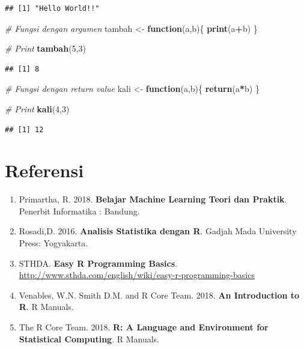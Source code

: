 \documentclass[]{book}
\newenvironment{Shaded}{\begin{snugshade}}{\end{snugshade}}
\newcommand{\KeywordTok}[1]{\textcolor[rgb]{0.13,0.29,0.53}{\textbf{#1}}}
\newcommand{\DecValTok}[1]{\textcolor[rgb]{0.00,0.00,0.81}{#1}}
\newcommand{\StringTok}[1]{\textcolor[rgb]{0.31,0.60,0.02}{#1}}
\newcommand{\CommentTok}[1]{\textcolor[rgb]{0.56,0.35,0.01}{\textit{#1}}}
\newcommand{\ControlFlowTok}[1]{\textcolor[rgb]{0.13,0.29,0.53}{\textbf{#1}}}
\newcommand{\OperatorTok}[1]{\textcolor[rgb]{0.81,0.36,0.00}{\textbf{#1}}}
\newcommand{\NormalTok}[1]{#1}
\providecommand{\tightlist}{%
  \setlength{\itemsep}{0pt}\setlength{\parskip}{0pt}}
\begin{document}
\begin{verbatim}
## [1] "Hello World!!"
\end{verbatim}

\begin{Shaded}
\begin{Highlighting}[]
\CommentTok{# Fungsi dengan argumen}
\NormalTok{tambah <-}\StringTok{ }\ControlFlowTok{function}\NormalTok{(a,b)\{}
  \KeywordTok{print}\NormalTok{(a}\OperatorTok{+}\NormalTok{b)}
\NormalTok{\}}

\CommentTok{# Print}
\KeywordTok{tambah}\NormalTok{(}\DecValTok{5}\NormalTok{,}\DecValTok{3}\NormalTok{)}
\end{Highlighting}
\end{Shaded}

\begin{verbatim}
## [1] 8
\end{verbatim}

\begin{Shaded}
\begin{Highlighting}[]
\CommentTok{# Fungsi dengan return value}
\NormalTok{kali <-}\StringTok{ }\ControlFlowTok{function}\NormalTok{(a,b)\{}
  \KeywordTok{return}\NormalTok{(a}\OperatorTok{*}\NormalTok{b)}
\NormalTok{\}}

\CommentTok{# Print}
\KeywordTok{kali}\NormalTok{(}\DecValTok{4}\NormalTok{,}\DecValTok{3}\NormalTok{)}
\end{Highlighting}
\end{Shaded}

\begin{verbatim}
## [1] 12
\end{verbatim}

\section{Referensi}\label{referensi-1}

\begin{enumerate}
\def\labelenumi{\arabic{enumi}.}
\tightlist
\item
  Primartha, R. 2018. \textbf{Belajar Machine Learning Teori dan
  Praktik}. Penerbit Informatika : Bandung.
\item
  Rosadi,D. 2016. \textbf{Analisis Statistika dengan R}. Gadjah Mada
  University Press: Yogyakarta.
\item
  STHDA. \textbf{Easy R Programming Basics}.
  \url{http://www.sthda.com/english/wiki/easy-r-programming-basics}
\item
  Venables, W.N. Smith D.M. and R Core Team. 2018. \textbf{An
  Introduction to R}. R Manuals.
\item
  The R Core Team. 2018. \textbf{R: A Language and Environment for
  Statistical Computing}. R Manuals.
\end{enumerate}
\end{document}
